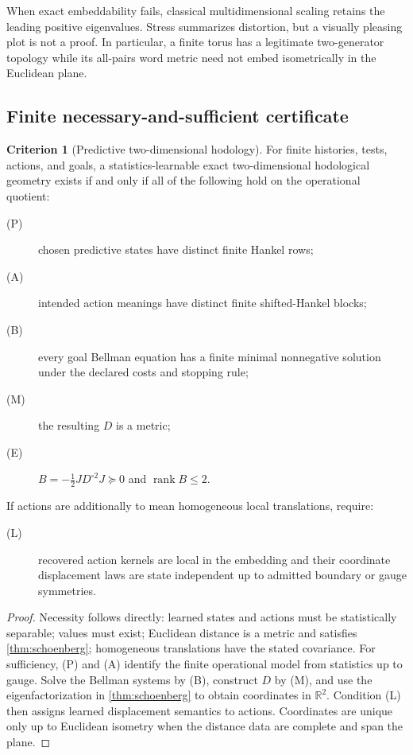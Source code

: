 \documentclass[11pt]{article}
\theoremstyle{definition}
\newtheorem{criterion}[theorem]{Criterion}
\theoremstyle{remark}
\newcommand{\rank}{\operatorname{rank}}
\newcommand{\R}{\mathbb R}
\begin{document}
When exact embeddability fails, classical multidimensional scaling retains the
leading positive eigenvalues. Stress summarizes distortion, but a visually
pleasing plot is not a proof. In particular, a finite torus has a legitimate
two-generator topology while its all-pairs word metric need not embed
isometrically in the Euclidean plane.

\subsection{Finite necessary-and-sufficient certificate}

\begin{criterion}[Predictive two-dimensional hodology]
\label{crit:atlas}
For finite histories, tests, actions, and goals, a statistics-learnable exact
two-dimensional hodological geometry exists if and only if all of the
following hold on the operational quotient:
\begin{description}
\item[(P)] chosen predictive states have distinct finite Hankel rows;
\item[(A)] intended action meanings have distinct finite shifted-Hankel blocks;
\item[(B)] every goal Bellman equation has a finite minimal nonnegative
solution under the declared costs and stopping rule;
\item[(M)] the resulting \(D\) is a metric;
\item[(E)] \(B=-\frac12JD^{\circ2}J\succeq0\) and \(\rank B\le2\).
\end{description}
If actions are additionally to mean homogeneous local translations, require:
\begin{description}
\item[(L)] recovered action kernels are local in the embedding and their
coordinate displacement laws are state independent up to admitted boundary
or gauge symmetries.
\end{description}
\end{criterion}

\begin{proof}
Necessity follows directly: learned states and actions must be statistically
separable; values must exist; Euclidean distance is a metric and satisfies
\cref{thm:schoenberg}; homogeneous translations have the stated covariance.
For sufficiency, (P) and (A) identify the finite operational model from
statistics up to gauge. Solve the Bellman systems by (B), construct \(D\) by
(M), and use the eigenfactorization in \cref{thm:schoenberg} to obtain
coordinates in \(\R^2\). Condition (L) then assigns learned displacement
semantics to actions. Coordinates are unique only up to Euclidean isometry
when the distance data are complete and span the plane.
\end{proof}
\end{document}
